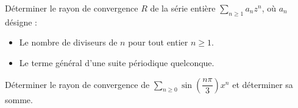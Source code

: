 \documentclass[a4paper,10pt]{report}
\newcommand{\Sum}[2]{\ensuremath{\textstyle{\sum\limits_{#1}^{#2}}}}
\begin{document}
\begin{Exercice}{} Déterminer le rayon de convergence $R$ de la série entière $\Sum{n\geq 1}{} a_n z^n$, où $a_n$ désigne : 
\begin{itemize}
\item Le nombre de diviseurs de $n$ pour tout entier $n\geq 1$.
\item Le terme général d'une suite périodique quelconque. 
\end{itemize}
\end{Exercice}


\begin{Exercice}{}
Déterminer le rayon de convergence de $\Sum{n\geq 0}{} \sin \left( \dfrac{n \pi}{3} \right) x^n$ et déterminer sa somme.
\end{Exercice}
\end{document}
